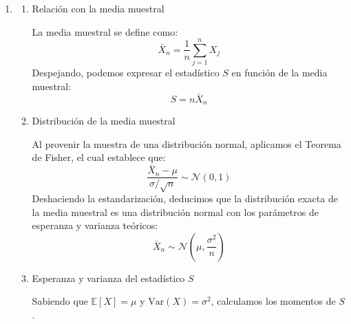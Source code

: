\begin{enumerate}[label=\color{red}\textbf{\arabic*)}]
\begin{enumerate}[label=\arabic*)]
		            Expresamos $S$ en función de la media muestral  $\bar{X}$: \[
			            \bar{X}=\dfrac{1}{n}\sum_{j=1}^{n} X_j\implies S=n\bar{X}
		            \]
		            Sea $\mu=E[X]$ y $\sigma^2=\mathrm{Var}(X)$, sabemos que: \[
			            \begin{array}{c}
				            E[\bar{X}]=\mu \\
				            \mathrm{Var}(\bar{X})=\dfrac{\sigma^2}{n}
			            \end{array}
		            \]
		            Si el tamaño muestral es "suficientemente" grande ($n\ge 30$), aplicamos el Teorema Central de Límite: \[
			            \bar{X}\sim \mathcal{N}\left( \mu,\dfrac{\sigma^2}{n} \right) \text{ aproximadamente }
		            \]
		            Aplicando la transformación lineal $S=n\bar{X}$, la distribución asintótica de la suma es: \[
			            S\sim \mathcal{N}(n\mu,n\sigma^2)\text{ aproximadamente }
		            \]
	      \end{enumerate}
	\item {}

	      \begin{enumerate}[label=\arabic*)]
		      \item Relación con la media muestral

		            La media muestral se define como: \[
			            \bar{X}_n=\dfrac{1}{n}\sum_{j=1}^{n} X_j
		            \]
		            Despejando, podemos expresar el estadístico $S$ en función de la media muestral:  $$S=n\bar{X}_n$$
		      \item Distribución de la media muestral

		            Al provenir la muestra de una distribución normal, aplicamos el Teorema de Fisher, el cual establece que: \[
			            \dfrac{\bar{X}_n-\mu}{\sigma / \sqrt{n} }\sim \mathcal{N}(0,1)
		            \]
		            Deshaciendo la estandarización, deducimos que la distribución exacta de la media muestral es una distribución normal con los parámetros de esperanza y varianza teóricos: \[
			            \bar{X}_n\sim \mathcal{N}\left( \mu,\dfrac{\sigma^2}{n} \right)
		            \]
		      \item Esperanza y varianza del estadístico $S$

		            Sabiendo que  $\mathbb{E}[X]=\mu$ y $\mathrm{Var}(X)=\sigma^2$, calculamos los momentos de $S$.


\end{enumerate}
\end{enumerate}
